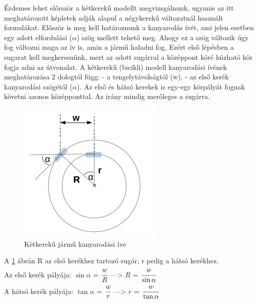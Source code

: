 

Érdemes lehet előrször a kétkerekű modellt megvizsgálnunk, ugyanis az itt meghatározott képletek adják alapul a négykerekű változatnál használt formulákat. Először is meg kell határoznunk a kanyarodás ívét, ami jelen esetben egy adott elfordulási ($\alpha$) szög mellett tehető meg. Ahogy ez a szög változik úgy fog változni maga az ív is, amin a jármű haladni fog. Ezért első lépésben a sugarat kell megkeresnünk, mert az adott sugárral a középpont köré húzható kör fogja adni az útvonalat. 
A kétkerekű (bicikli) modell kanyarodási ívének meghatározása 2 dologtól függ:\newline
\phantom{len} - a tengelytávolságtól (w),\newline
\phantom{len} - az első kerék kanyarodási szögétől ($\alpha$).\newline
Az első és hátsó kerekek is egy-egy körpályát fognak követni azonos középponttal. Az irány mindig merőleges a sugárra.

\begin{figure}[h!]
\centering
\includegraphics[scale=0.5]{images/two_wheels_rad.png}
\caption{Kétkerekű jármű kanyarodási íve}
\label{fig:two_wheels_rad}
\end{figure}
A \ref{fig:two_wheels_rad} ábrán R az első kerékhez tartozó sugár, r pedig a hátsó kerékhez.\\
Az első kerék pályája: $\sin\alpha$ = $\cfrac{w}{R}$ \hspace{5mm}---> \hspace{5mm} $R$ = $\cfrac{w}{\sin\alpha}$ \\
A hátsó kerék pályája: $\tan\alpha$ = $\cfrac{w}{r}$ \hspace{5mm}---> \hspace{5mm} $r$ = $\cfrac{w}{\tan\alpha}$
\\

